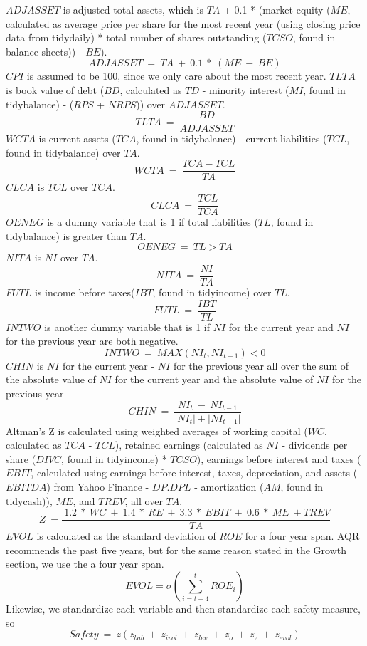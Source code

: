 \documentclass[12pt]{article}
\begin{document}
$ADJASSET$ is adjusted total assets, which is $TA$ + 0.1 * (market equity ($ME$, calculated as average price per share for the most recent year (using closing price data from tidydaily) * total number of shares outstanding ($TCSO$, found in balance sheets)) - $BE$). $$ADJASSET \ = \ TA \ + \ 0.1 \ * \ (ME \ - \ BE)$$ $CPI$ is assumed to be 100, since we only care about the most recent year. $TLTA$ is book value of debt ($BD$, calculated as $TD$ - minority interest ($MI$, found in tidybalance) - ($RPS$ + $NRPS$)) over $ADJASSET$. $$TLTA \ = \ \frac{BD}{ADJASSET}$$ $WCTA$ is current assets ($TCA$, found in tidybalance) - current liabilities ($TCL$, found in tidybalance) over $TA$. $$WCTA \ = \ \frac{TCA - TCL}{TA}$$ $CLCA$ is $TCL$ over $TCA$. $$ CLCA \ = \ \frac{TCL}{TCA}$$ $OENEG$ is a dummy variable that is 1 if total liabilities ($TL$, found in tidybalance) is greater than $TA$. $$ OENEG \ = \ TL > TA $$ $NITA$ is $NI$ over $TA$. $$NITA \ = \ \frac{NI}{TA}$$ $FUTL$ is income before taxes($IBT$, found in tidyincome) over $TL$. $$FUTL \ = \ \frac{IBT}{TL}$$ $INTWO$ is another dummy variable that is 1 if $NI$ for the current year and $NI$ for the previous year are both negative. $$INTWO \ = \ MAX(NI_t,NI_{t-1}) < 0$$ $CHIN$ is $NI$ for the current year - $NI$ for the previous year all over the sum of the absolute value of $NI$ for the current year and the absolute value of $NI$ for the previous year $$CHIN \ = \ \frac{NI_t \ - \ NI_{t-1}}{|NI_t| + |NI_{t-1}|}$$ Altman's Z is calculated using weighted averages of working capital ($WC$, calculated as $TCA$ - $TCL$), retained earnings (calculated as $NI$ - dividends per share ($DIVC$, found in tidyincome) * $TCSO$), earnings before interest and taxes ($EBIT$, calculated using earnings before interest, taxes, depreciation, and assets ($EBITDA$) from Yahoo Finance - $DP.DPL$ - amortization ($AM$, found in tidycash)), $ME$, and $TREV$, all over $TA$. $$Z \ = \frac{\ 1.2 \ * \ WC \ + \ 1.4 \ * \ RE \ + \ 3.3 \ * \ EBIT \ + \ 0.6 \ * \ ME \ + TREV}{TA}$$ $EVOL$ is calculated as the standard deviation of $ROE$ for a four year span. AQR recommends the past five years, but for the same reason stated in the Growth section, we use the a four year span. $$EVOL = \sigma(\sum_{i=t-4}^{t}ROE_i)$$ Likewise, we standardize each variable and then standardize each safety measure, so $$Safety \ = \ z(z_{bab} \ + \ z_{ivol} \ + \ z_{lev} \ + \ z_{o} \ + \ z_{z} \ + \ z_{evol})$$ 
\end{document}
